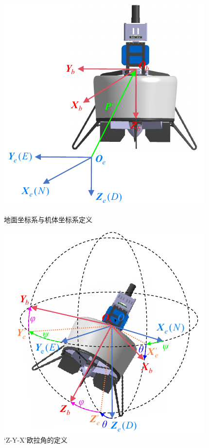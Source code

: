 \begin{figure}[htbp]
	\centering
	\begin{minipage}[c]{0.5\textwidth}
		\centering
		\includegraphics[scale=1]{Fig/演示文稿1.pdf}
		\caption{\label{坐标系}地面坐标系与机体坐标系定义}
	\end{minipage}%
    \begin{minipage}[c]{0.5\textwidth}
		\centering
		\includegraphics[scale=1]{Fig/演示文稿2.pdf}
		\caption{\label{欧拉角}‘Z-Y-X’欧拉角的定义}
	\end{minipage}%
\end{figure}

